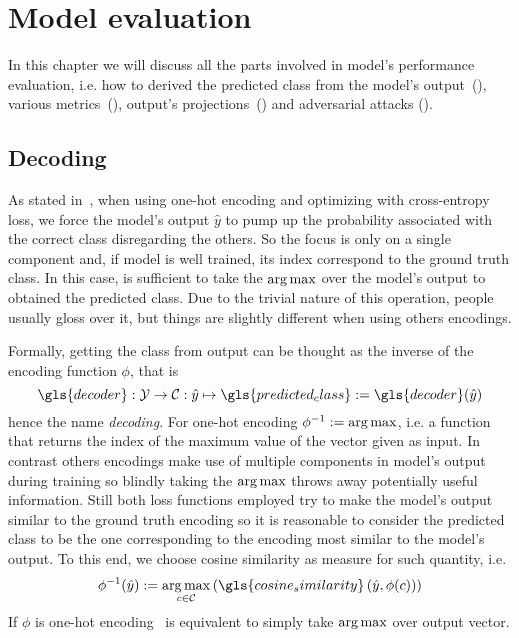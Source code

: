 \chapter{Model evaluation}
\label{ch:model-evaluation}

In this chapter we will discuss all the parts involved in model's performance
evaluation, i.e. how to derived the predicted class from the model's
output~(), various metrics~(),
output's projections~() and adversarial attacks
().

\section{Decoding}
\label{sec:decoding}
As stated in~, when using one-hot encoding and
optimizing with cross-entropy loss, we force the model's output $\hat{y}$ to
pump up the probability associated with the correct class disregarding the
others. So the focus is only on a single component and, if model is well
trained, its index correspond to the ground truth class. In this case, is
sufficient to take the $\operatorname*{arg\,max}$ over the model's output to obtained the
predicted class. Due to the trivial nature of this operation, people usually
gloss over it, but things are slightly different when using others
encodings.\medskip

Formally, getting the class from output can be thought as the inverse of the
encoding function $\phi$, that is
\begin{equation}
  \gls{decoder} : \mathcal{Y} \to \mathcal{C}
  : \hat{y} \mapsto \gls{predicted_class} := \gls{decoder}(\hat{y})
  \label{eq:decoding}
\end{equation}
hence the name \emph{decoding}. For one-hot encoding $\phi^{-1} := \operatorname*{arg\,max}$,
i.e. a function that returns the index of the maximum value of the vector given
as input. In contrast others encodings make use of multiple components in
model's output during training so blindly taking the $\operatorname*{arg\,max}$ throws away
potentially useful information. Still both loss functions employed try to make
the model's output similar to the ground truth encoding so it is reasonable to
consider the predicted class to be the one corresponding to the encoding most
similar to the model's output. To this end, we choose cosine similarity as
measure for such quantity, i.e.
\begin{equation}
  \phi^{-1}(\hat{y}) := \argmax_{c \in \mathcal{C}}
  \left( \gls{cosine_similarity} \left(\hat{y}, \phi(c) \right) \right)
  \label{eq:decoding-cos-sim}
\end{equation}
If $\phi$ is one-hot encoding~ is equivalent to simply
take $\operatorname*{arg\,max}$ over output vector.


